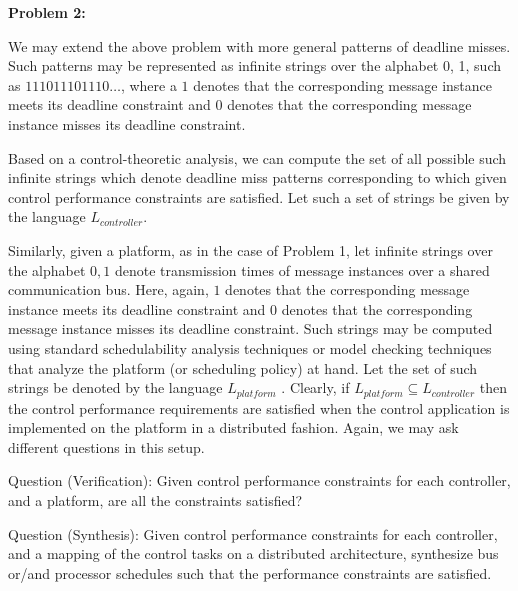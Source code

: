 

\textbf{Problem 2:}

We may extend the above problem with more general patterns of deadline
misses. Such patterns may be represented as infinite strings over the alphabet {0, 1},
such as $111011101110 \dots$, where a $1$ denotes that the corresponding
message instance meets its deadline constraint and $0$ denotes that the corresponding 
message instance misses its deadline constraint.

Based on a control-theoretic analysis, we can compute the set of all possible
such infinite strings which denote deadline miss patterns corresponding to which
given control performance constraints are satisfied. Let such a set of strings be
given by the language $L_{controller}$.

Similarly, given a platform, as in the case of Problem 1, let infinite strings
over the alphabet ${0, 1}$ denote transmission times of message instances over a
shared communication bus. Here, again, $1$ denotes that the corresponding message
instance meets its deadline constraint and $0$ denotes that the corresponding
message instance misses its deadline constraint. Such strings may be computed
using standard schedulability analysis techniques or model checking techniques
that analyze the platform (or scheduling policy) at hand. Let the set of such
strings be denoted by the language $L_{platform}$ .
Clearly, if $L_{platform} \subseteq L_{controller}$ then the control performance requirements
are satisfied when the control application is implemented on the platform in a
distributed fashion.
Again, we may ask different questions in this setup.


Question (Verification): Given control performance constraints for each 
controller, and a platform, are all the constraints satisfied?

Question (Synthesis): Given control performance constraints for each controller,
and a mapping of the control tasks on a distributed architecture, synthesize
bus or/and processor schedules such that the performance constraints
are satisfied.

